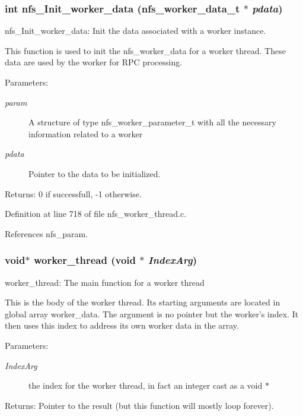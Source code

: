 \subsubsection{\setlength{\rightskip}{0pt plus 5cm}int nfs\_\-Init\_\-worker\_\-data (nfs\_\-worker\_\-data\_\-t $\ast$ {\em pdata})}\label{nfs__worker__thread_8c_a19}


nfs\_\-Init\_\-worker\_\-data: Init the data associated with a worker instance.

This function is used to init the nfs\_\-worker\_\-data for a worker thread. These data are used by the worker for RPC processing.

\begin{Desc}
\item[Parameters:]
\begin{description}
\item[{\em param}]A structure of type nfs\_\-worker\_\-parameter\_\-t with all the necessary information related to a worker \item[{\em pdata}]Pointer to the data to be initialized.\end{description}
\end{Desc}
\begin{Desc}
\item[Returns:]0 if successfull, -1 otherwise. \end{Desc}


Definition at line 718 of file nfs\_\-worker\_\-thread.c.

References nfs\_\-param.
\subsubsection{\setlength{\rightskip}{0pt plus 5cm}void$\ast$ worker\_\-thread (void $\ast$ {\em Index\-Arg})}\label{nfs__worker__thread_8c_a20}


worker\_\-thread: The main function for a worker thread

This is the body of the worker thread. Its starting arguments are located in global array worker\_\-data. The argument is no pointer but the worker's index. It then uses this index to address its own worker data in the array.

\begin{Desc}
\item[Parameters:]
\begin{description}
\item[{\em Index\-Arg}]the index for the worker thread, in fact an integer cast as a void $\ast$\end{description}
\end{Desc}
\begin{Desc}
\item[Returns:]Pointer to the result (but this function will mostly loop forever). \end{Desc}



